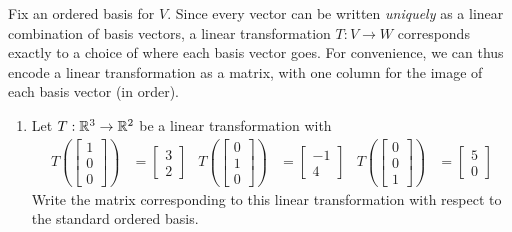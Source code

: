 \documentclass{article}
\begin{document}
\begin{app}
Fix an ordered basis for $V$.  Since every vector can be written {\em uniquely} as a linear combination of basis vectors, a linear transformation $T:V \rightarrow W$ corresponds exactly to a choice of where each basis vector goes.  For convenience, we can thus encode a linear transformation as a matrix, with one column for the image of each basis vector (in order).

\begin{enumerate}[1)]
\item Let $T: \mathbb{R}^3 \rightarrow \mathbb{R}^2$ be a linear transformation with
\begin{align*}
T\left(\begin{bmatrix} 1 \\ 0 \\ 0 \end{bmatrix} \right) &= \begin{bmatrix} 3 \\ 2\end{bmatrix} &
T\left(\begin{bmatrix} 0 \\ 1 \\ 0 \end{bmatrix} \right) &= \begin{bmatrix} -1 \\ 4\end{bmatrix} &
T\left(\begin{bmatrix} 0 \\ 0 \\ 1 \end{bmatrix} \right) &= \begin{bmatrix} 5 \\ 0\end{bmatrix}
\end{align*}
Write the matrix corresponding to this linear transformation with respect to the standard ordered basis.


\end{enumerate}
\end{app}
\end{document}
